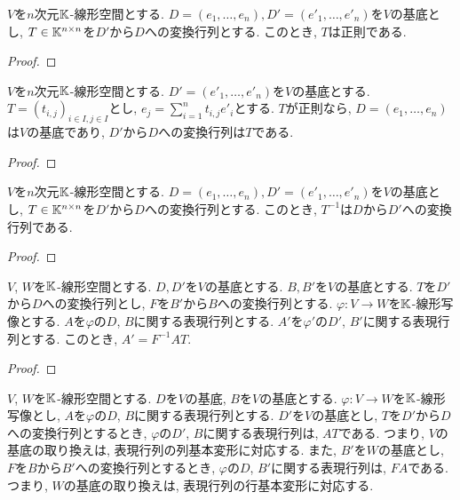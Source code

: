 \begin{prop}
  $V$を$n$次元$\mathbb{K}$-線形空間とする.
  $D=(e_1,\ldots, e_n),D'=(e'_1,\ldots, e'_n)$を$V$の基底とし,
  $T\in\mathbb{K}^{n\times n}$を$D'$から$D$への変換行列とする.
  このとき, $T$は正則である.
\end{prop}
\begin{proof}\end{proof}

\begin{prop}
  $V$を$n$次元$\mathbb{K}$-線形空間とする.
  $D'=(e'_1,\ldots, e'_n)$を$V$の基底とする.
  $T=(t_{i,j})_{i\in I, j\in I}$とし,
  $e_j=\sum_{i=1}^n t_{i,j}e'_i$とする.
  $T$が正則なら,
  $D=(e_1,\ldots, e_n)$は$V$の基底であり,
  $D'$から$D$への変換行列は$T$である.
\end{prop}
\begin{proof}\end{proof}


\begin{prop}
  $V$を$n$次元$\mathbb{K}$-線形空間とする.
  $D=(e_1,\ldots, e_n),D'=(e'_1,\ldots, e'_n)$を$V$の基底とし,
  $T\in\mathbb{K}^{n\times n}$を$D'$から$D$への変換行列とする.
  このとき, $T^{-1}$は$D$から$D'$への変換行列である.
\end{prop}
\begin{proof}\end{proof}



\begin{prop}
  $V$, $W$を$\mathbb{K}$-線形空間とする.
  $D, D'$を$V$の基底とする.
  $B, B'$を$V$の基底とする.
  $T$を$D'$から$D$への変換行列とし,
  $F$を$B'$から$B$への変換行列とする.
  $\varphi\colon V\to W$を$\mathbb{K}$-線形写像とする.
  $A$を$\varphi$の$D$, $B$に関する表現行列とする.
  $A'$を$\varphi'$の$D'$, $B'$に関する表現行列とする.
  このとき,
  $A'=F^{-1}AT$.
\end{prop}
\begin{proof}\end{proof}

\begin{remark}
  $V$, $W$を$\mathbb{K}$-線形空間とする.
  $D$を$V$の基底,
  $B$を$V$の基底とする.
  $\varphi\colon V\to W$を$\mathbb{K}$-線形写像とし,
  $A$を$\varphi$の$D$, $B$に関する表現行列とする.
  $D'$を$V$の基底とし,
  $T$を$D'$から$D$への変換行列とするとき,
  $\varphi$の$D'$, $B$に関する表現行列は,
  $AT$である.
  つまり, $V$の基底の取り換えは,
  表現行列の列基本変形に対応する.
  また,
  $B'$を$W$の基底とし,
  $F$を$B$から$B'$への変換行列とするとき,
  $\varphi$の$D$, $B'$に関する表現行列は,
  $FA$である.
  つまり, $W$の基底の取り換えは,
  表現行列の行基本変形に対応する.
\end{remark}


